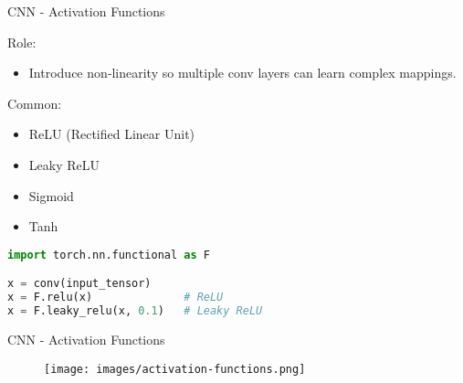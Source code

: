 \begin{frame}[fragile]{CNN - Activation Functions}
\begin{block}{Role:}
    \begin{itemize}
        \item Introduce non‑linearity so multiple conv layers can learn complex mappings.
    \end{itemize}
\end{block}

\begin{block}{Common:}
    \begin{itemize}
        \item ReLU (Rectified Linear Unit)
        \item Leaky ReLU
        \item Sigmoid
        \item Tanh
    \end{itemize}
\end{block}

\begin{lstlisting}[language=Python, caption={Code snippet (PyTorch)}, basicstyle=\ttfamily\footnotesize]
import torch.nn.functional as F

x = conv(input_tensor)
x = F.relu(x)              # ReLU
x = F.leaky_relu(x, 0.1)   # Leaky ReLU
\end{lstlisting}
\end{frame}  

\begin{frame}{CNN - Activation Functions}
    \begin{figure}
    \centering
    \texttt{[image: images/activation-functions.png]}
    \end{figure}
\end{frame}